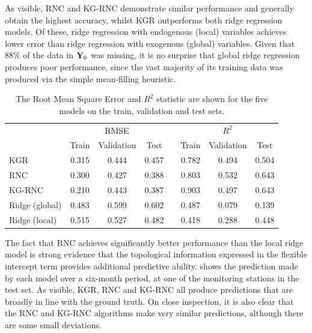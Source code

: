 \newpage

As visible, RNC and KG-RNC demonstrate similar performance and generally obtain the highest accuracy, whilst KGR outperforms both ridge regression models. Of these, ridge regression with endogenous (local) variables achieves lower error than ridge regression with exogenous (global) variables. Given that 88\% of the data in $\mathbf{Y}_0$ was missing, it is no surprise that global ridge regression produces poor performance, since the vast majority of its training data was produced via the simple mean-filling heuristic.


\begin{table}[t]
    \vspace*{1.5cm}
    \centering
    \def\arraystretch{1.5}
    \begin{tabular}{@{}lccccccc}
    \toprule
    & \multicolumn{3}{c}{RMSE} & \phantom{abc} & \multicolumn{3}{c}{$R^2$} \\
    \cmidrule{2-4} \cmidrule{6-8}
    & Train & Validation & Test && Train & Validation & Test \\
    \midrule 
    KGR & 0.315 & 0.444 & 0.457 && 0.782 & 0.494 & 0.504 \\
    RNC & 0.300 & \colorbox{best!35}{0.427} & 0.388 && 0.803 & \colorbox{best!35}{0.532} & \colorbox{best!35}{0.643} \\
    KG-RNC & \colorbox{best!35}{0.210} & 0.443 & \colorbox{best!35}{0.387} && \colorbox{best!35}{0.903} & 0.497 & \colorbox{best!35}{0.643} \\
    Ridge (global) & 0.483 & 0.599 & 0.602 && 0.487 & 0.079 & 0.139 \\
    Ridge (local) & 0.515 & 0.527 & 0.482 && 0.418 & 0.288 & 0.448 \\
    \bottomrule 
    \end{tabular}
    \caption{The Root Mean Square Error and $R^2$ statistic are shown for the five models on the train, validation and test sets. }
    \label{tab:cali_results}
    \vspace*{1.5cm}
\end{table}

The fact that RNC achieves significantly better performance than the local ridge model is strong evidence that the topological information expressed in the flexible intercept term provides additional predictive ability.  shows the prediction made by each model over a six-month period, at one of the monitoring stations in the test set. As visible, KGR, RNC and KG-RNC all produce predictions that are broadly in line with the ground truth. On close inspection, it is also clear that the RNC and KG-RNC algorithms make very similar predictions, although there are some small deviations. 


